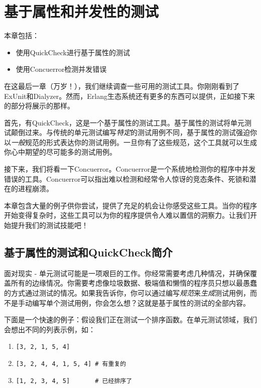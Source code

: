 \chapter{基于属性和并发性的测试}\label{chapt:testing}

本章包括：

\begin{itemize}

\item
  使用QuickCheck进行基于属性的测试
\item
  使用Concuerror检测并发错误
\end{itemize}

在这最后一章（万岁！），我们继续调查一些可用的测试工具。你刚刚看到了ExUnit和Dialyzer。然而，Erlang生态系统还有更多的东西可以提供，正如接下来的部分将展示的那样。

首先，有QuickCheck，这是一个基于属性的测试工具。基于属性的测试将单元测试颠倒过来。与传统的单元测试编写\emph{特定}的测试用例不同，基于属性的测试强迫你以\emph{一般}规范的形式表达你的测试用例。一旦你有了这些规范，这个工具就可以生成你心中期望的尽可能多的测试用例。

接下来，我们将看一下Concuerror。Concuerror是一个系统地检测你的程序中并发错误的工具。Concuerror可以指出难以检测和经常令人惊讶的竞态条件、死锁和潜在的进程崩溃。

本章包含大量的例子供你尝试，提供了充足的机会让你感受这些工具。当你的程序开始变得复杂时，这些工具可以为你的程序提供令人难以置信的洞察力。让我们开始提升我们的测试技能吧！

\section{基于属性的测试和QuickCheck简介}

面对现实 -
单元测试可能是一项艰巨的工作。你经常需要考虑几种情况，并确保覆盖所有的边缘情况。你需要考虑像垃圾数据、极端值和懒惰的程序员只想以最愚蠢的方式通过测试的情况。如果我告诉你，你可以通过编写\emph{规范}来\emph{生成}测试用例，而不是手动编写单个测试用例，你会怎么想？这就是基于属性的测试的全部内容。

下面是一个快速的例子：假设我们正在测试一个排序函数。在单元测试领域，我们会想出不同的列表示例，如：

\begin{enumerate}
  \item \texttt{[3, 2, 1, 5, 4]}
  \item \texttt{[3, 2, 4, 4, 1, 5, 4] \# 有重复的}
  \item \texttt{[1, 2, 3, 4, 5]       \# 已经排序了}
\end{enumerate}


